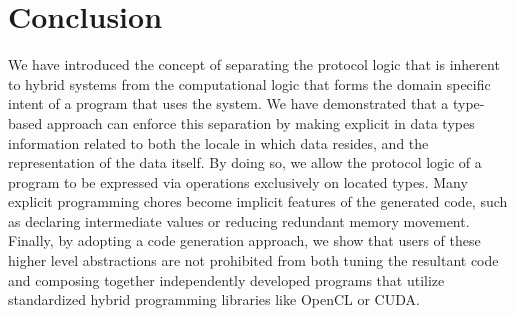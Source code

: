 
\section{Conclusion}
\label{sec:conclusion}

We have introduced the concept of separating the protocol logic that is inherent to hybrid systems from the computational logic that forms the domain specific intent of a program that uses the system. We have demonstrated that a type-based approach can enforce this separation by making explicit in data types information related to both the locale in which data resides, and the representation of the data itself. By doing so, we allow the protocol logic of a program to be expressed via operations exclusively on located types. Many explicit programming chores become implicit features of the generated code, such as declaring intermediate values or reducing redundant memory movement. Finally, by adopting a code generation approach, we show that users of these higher level abstractions are not prohibited from both tuning the resultant code and composing together independently developed programs that utilize standardized hybrid programming libraries like OpenCL or CUDA.
